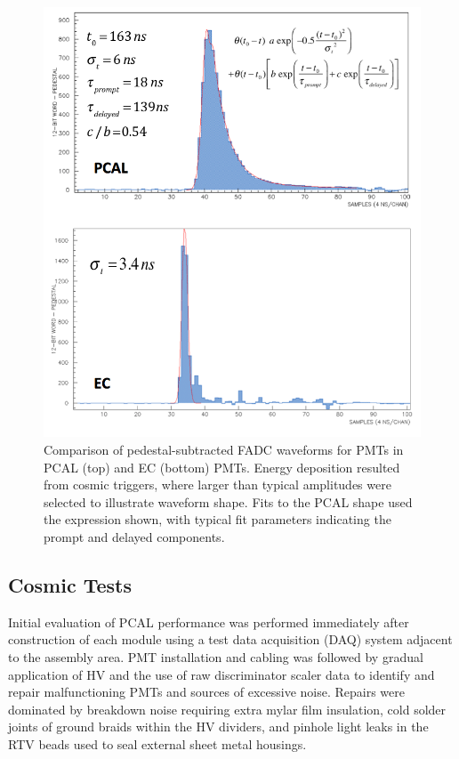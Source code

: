 \begin{figure}[hbt]
\centering
\includegraphics[width=0.95\columnwidth,keepaspectratio]{img/S5_3.png}
\caption{Comparison of pedestal-subtracted FADC waveforms for PMTs in PCAL (top) and EC (bottom) PMTs.
  Energy deposition resulted from cosmic triggers, where larger than typical amplitudes were selected to
  illustrate waveform shape. Fits to the PCAL shape used the expression shown, with typical fit parameters
  indicating the prompt and delayed components.}
\label{fig:S5_3}
\end{figure}

\subsection{Cosmic Tests}
\label{CRT}

Initial evaluation of PCAL performance was performed immediately after construction of each module using a
test data acquisition (DAQ) system adjacent to the assembly area. PMT installation and cabling was followed by
gradual application of HV and the use of raw discriminator scaler data to identify and repair malfunctioning PMTs
and sources of excessive noise. Repairs were dominated by breakdown noise requiring extra mylar film insulation,
cold solder joints of ground braids within the HV dividers, and pinhole light leaks in the RTV beads used to seal
external sheet metal housings. 

